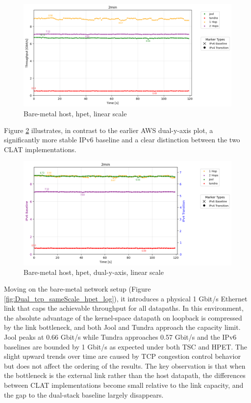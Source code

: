 \begin{figure}[H]
    \centering
    \includegraphics[width=1\textwidth]{resources/finalPlots/combinedplots/SingleLocal_tcp_sameScale_hpet_2min_linear.png}
    \caption{Bare-metal host, hpet, linear scale}
    \label{fig:Local_tcp_sameScale_hpet_linear}
\end{figure}

Figure \ref{fig:Local_tcp_dualAxis_hpet_linear} illustrates, in contrast to the earlier AWS dual-y-axis plot, a significantly more stable IPv6 baseline and a clear distinction between the two CLAT implementations.

\begin{figure}[H]
    \centering
    \includegraphics[width=1\textwidth]{resources/finalPlots/Jitterplots/LocalSingle_tcp_dualAxis_hpet_2min_linear.png}
    \caption{Bare-metal host, hpet, dual-y-axis, linear scale}
    \label{fig:Local_tcp_dualAxis_hpet_linear}
\end{figure}



Moving on the bare-metal network setup (Figure \ref{fig:Dual_tcp_sameScale_hpet_log}), it introduces a physical 1 Gbit/s Ethernet link that caps the achievable throughput for all datapaths. In this environment, the absolute advantage of the kernel-space datapath on loopback is compressed by the link bottleneck, and both Jool and Tundra approach the capacity limit. Jool peaks at 0.66 Gbit/s while Tundra approaches 0.57 Gbit/s and the IPv6 baselines are bounded by 1 Gbit/s as expected under both TSC and HPET. The slight upward trends over time are caused by TCP congestion control behavior\cite{rfc5681} but does not affect the ordering of the results. The key observation is that when the bottleneck is the external link rather than the host datapath, the differences between CLAT implementations become small relative to the link capacity, and the gap to the dual-stack baseline largely disappears.


